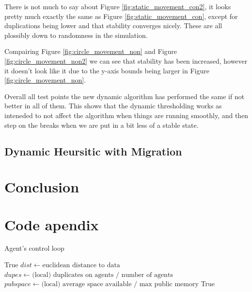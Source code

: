 \documentclass{UoYCSproject}
\begin{document}
There is not much to say about Figure \ref{fig:static_movement_con2}, it looks pretty much exactly the same as Figure \ref{fig:static_movement_con}, except for duplications being lower and that stability converges nicely.
These are all plossibly down to randomness in the simulation.

Compairing Figure \ref{fig:circle_movement_non} and Figure \ref{fig:circle_movement_non2} we can see that stability has been increased, however it doesn't look like it due to the y-axis bounds being larger in Figure \ref{fig:circle_movement_non}.

Overall all test points the new dynamic algorithm has performed the same if not better in all of them.
This shows that the dynamic thresholding works as inteneded to not affect the algorithm when things are running smoothly, and then step on the breaks when we are put in a bit less of a stable state.


\section{Dynamic Heursitic with Migration}
\label{sec:Simple4a}



\chapter{Conclusion}
\label{cha:conclusion}


\appendix
\chapter{Code apendix}

\begin{algorithm}
\caption{Agent's control loop}
\label{Agent_Control_Loop2}
\begin{algorithmic}[1]
\State {}
\State
{}
\State {}
\State \Return True
\EndIf
\State
\State $dist \gets \text{euclidean distance to data}$
\State $dupes \gets \text{(local) duplicates on agents / number of agents}$
\State $pub space \gets \text{(local) average space available / max public memory}$
\State
{}
\State {}
\EndIf
\State
{}
\State {}
\EndIf
\State
\State {}
\State
\State \Return True
\EndProcedure
\end{algorithmic}
\end{algorithm}
\end{document}
